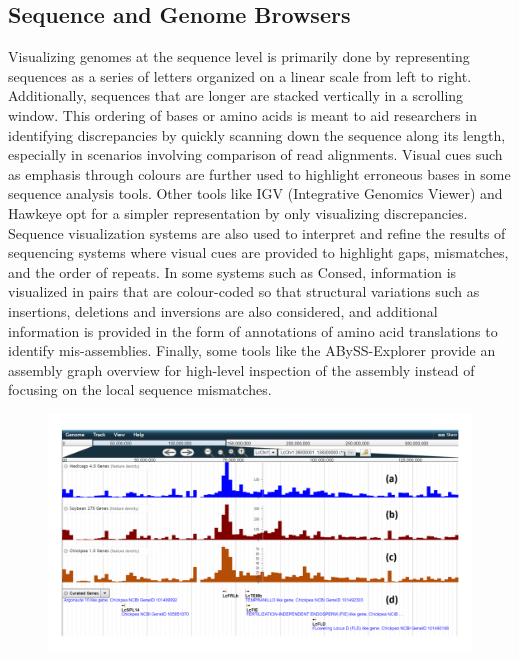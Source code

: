 \subsection{Sequence and Genome Browsers}
Visualizing genomes at the sequence level is primarily done by representing sequences
as a series of letters organized on a linear scale from left to right. Additionally, sequences that are longer are stacked vertically in a scrolling window. This ordering of bases or amino acids is meant to aid researchers in identifying discrepancies by quickly scanning down the sequence along its length, especially in scenarios involving comparison of read alignments. Visual cues such as emphasis through colours are further used to highlight erroneous bases in some sequence analysis tools\cite{consed,ewing1998base}. Other tools like IGV (Integrative Genomics Viewer)\cite{thorvaldsdottir2013integrative} and Hawkeye\cite{schatz2007hawkeye} opt for a simpler representation by only visualizing discrepancies. Sequence visualization systems are also used to interpret and refine the results of sequencing systems where visual cues are provided to highlight gaps, mismatches, and the order of repeats\cite{bonfield1995new,consed}. In some systems such as Consed\cite{consed}, information is visualized in pairs that are colour-coded so that structural variations such as insertions, deletions and inversions are also considered, and additional information is provided in the form of annotations of amino acid translations to identify mis-assemblies. Finally, some tools like the ABySS-Explorer provide an assembly graph overview for high-level inspection of the assembly instead of focusing on the local sequence mismatches\cite{nielsen2009abyss}. 


\begin{figure}
  \centering
  \includegraphics[width=1\linewidth]{images/ch_2_jbrowse.PNG}
  \label{fig:ch_2_jbrowse}
\end{figure}


